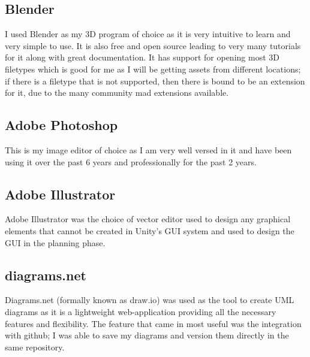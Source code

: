 \documentclass[12pt]{report}
\begin{document}
\subsection{Blender}
I used Blender as my 3D program of choice as it is very intuitive to learn and very simple to use. It is also free and open source leading to very many tutorials for it along with great documentation. It has support for opening most 3D filetypes which is good for me as I will be getting assets from different locations; if there is a filetype that is not supported, then there is bound to be an extension for it, due to the many community mad extensions available.

\subsection{Adobe Photoshop}
This is my image editor of choice as I am very well versed in it and have been using it over the past 6 years and professionally for the past 2 years.

\subsection{Adobe Illustrator}
Adobe Illustrator was the choice of vector editor used to design any graphical elements that cannot be created in Unity's GUI system and used to design the GUI in the planning phase. 

\subsection{diagrams.net}
Diagrams.net (formally known as draw.io) was used as the tool to create UML diagrams as it is a lightweight web-application providing all the necessary features and flexibility. The feature that came in most useful was the integration with github; I was able to save my diagrams and version them directly in the same repository.

\end{document}
